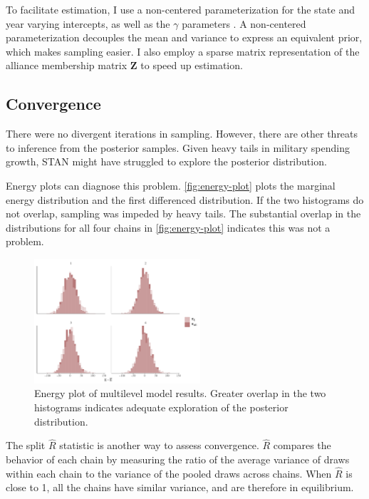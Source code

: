 \documentclass[12pt]{article}
\begin{document}
To facilitate estimation, I use a non-centered parameterization for the state and year varying intercepts, as well as the $\gamma$ parameters \citep{BetancourtGirolani2015}. 
A non-centered parameterization decouples the mean and variance to express an equivalent prior, which makes sampling easier. 
I also employ a sparse matrix representation of the alliance membership matrix $\textbf{Z}$ to speed up estimation. 


\subsection{Convergence} 


There were no divergent iterations in sampling. 
However, there are other threats to inference from the posterior samples. 
Given heavy tails in military spending growth, STAN might have struggled to explore the posterior distribution. 


Energy plots can diagnose this problem. 
\autoref{fig:energy-plot} plots the marginal energy distribution and the first differenced distribution. 
If the two histograms do not overlap, sampling was impeded by heavy tails. 
The substantial overlap in the distributions for all four chains in \autoref{fig:energy-plot} indicates this was not a problem. 


\begin{figure}
	\centering
		\includegraphics[width=0.55\textwidth]{energy-plot.pdf}
	\caption{Energy plot of multilevel model results. Greater overlap in the two histograms indicates adequate exploration of the posterior distribution. }
	\label{fig:energy-plot}
\end{figure}


The split $\hat{R}$ statistic is another way to assess convergence. 
$\hat{R}$ compares the behavior of each chain by measuring the ratio of the average variance of draws within each chain to the variance of the pooled draws across chains. 
When $\hat{R}$ is close to 1, all the chains have similar variance, and are therefore in equilibrium. 
\end{document}
